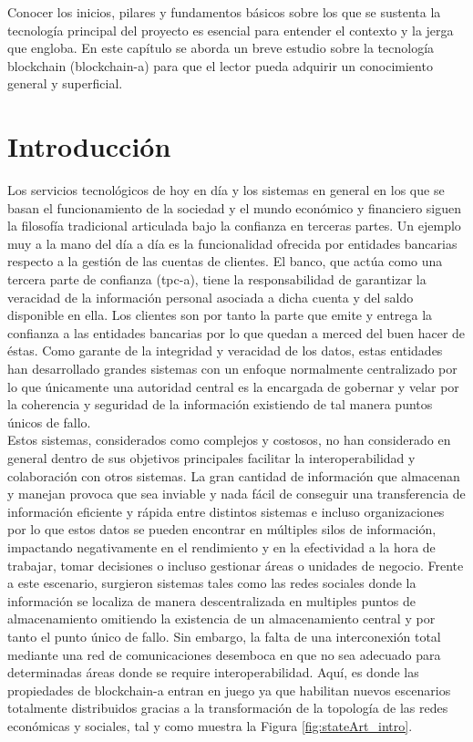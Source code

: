 \documentclass[12pt,a4paper, twoside]{report}
\begin{document}
	Conocer los inicios, pilares y fundamentos básicos sobre los que se sustenta la tecnología principal del proyecto es esencial para entender el contexto y la jerga que engloba. En este capítulo se aborda un breve estudio sobre la tecnología \Gls{blockchain} (\gls{blockchain-a}) para que el lector pueda adquirir un conocimiento general y superficial.

	\section{Introducción}
	
	Los servicios tecnológicos de hoy en día y los sistemas en general en los que se basan el funcionamiento de la sociedad y el mundo económico y financiero siguen la filosofía tradicional articulada bajo la confianza en terceras partes. Un ejemplo muy a la mano del día a día es la funcionalidad ofrecida por entidades bancarias respecto a la gestión de las cuentas de clientes. El banco, que actúa como una tercera parte de confianza (\gls{tpc-a}), tiene la responsabilidad de garantizar la veracidad de la información personal asociada a dicha cuenta y del saldo disponible en ella. Los clientes son por tanto la parte que emite y entrega la confianza a las entidades bancarias por lo que quedan a merced del buen hacer de éstas. Como garante de la integridad y veracidad de los datos, estas entidades han desarrollado grandes sistemas con un enfoque normalmente centralizado por lo que únicamente una autoridad central es la encargada de gobernar y velar por la coherencia y seguridad de la información existiendo de tal manera puntos únicos de fallo. \\
	
	Estos sistemas, considerados como complejos y costosos, no han considerado en general dentro de sus objetivos principales facilitar la interoperabilidad y colaboración con otros sistemas. La gran cantidad de información que almacenan y manejan provoca que sea inviable y nada fácil de conseguir una transferencia de información eficiente y rápida entre distintos sistemas e incluso organizaciones por lo que estos datos se pueden encontrar en múltiples silos de información, impactando negativamente en el rendimiento y en la efectividad a la hora de trabajar, tomar decisiones o incluso gestionar áreas o unidades de negocio. Frente a este escenario, surgieron sistemas tales como las redes sociales donde la información se localiza de manera descentralizada en multiples puntos de almacenamiento omitiendo la existencia de un almacenamiento central y por tanto el punto único de fallo. Sin embargo, la falta de una interconexión total mediante una red de comunicaciones desemboca en que no sea adecuado para determinadas áreas donde se require interoperabilidad. Aquí, es donde las propiedades de \gls{blockchain-a} entran en juego ya que habilitan nuevos escenarios totalmente distribuidos gracias a la transformación de la topología de las redes económicas y sociales, tal y como muestra la Figura \ref{fig:stateArt_intro}. \\
\end{document}
